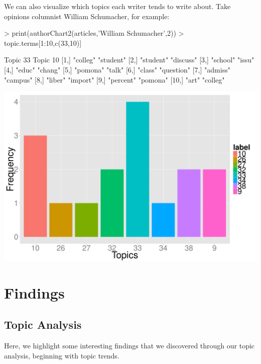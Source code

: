 \documentclass[a4paper]{article}
\begin{document}
We can also visualize which topics each writer tends to write about. Take opinions columnist William Schumacher, for example: 

\begin{Schunk}
\begin{Sinput}
> print(authorChart2(articles,'William Schumacher',2))
> topic.terms[1:10,c(33,10)]
\end{Sinput}
\begin{Soutput}
      Topic 33  Topic 10  
 [1,] "colleg"  "student" 
 [2,] "student" "discuss" 
 [3,] "school"  "issu"    
 [4,] "educ"    "chang"   
 [5,] "pomona"  "talk"    
 [6,] "class"   "question"
 [7,] "admiss"  "campus"  
 [8,] "liber"   "import"  
 [9,] "percent" "pomona"  
[10,] "art"     "colleg"  
\end{Soutput}
\end{Schunk}
\includegraphics{FinalProject-006}


\section{Findings}

\subsection{Topic Analysis}

Here, we highlight some interesting findings that we discovered through our topic analysis, beginning with topic trends.
\end{document}
